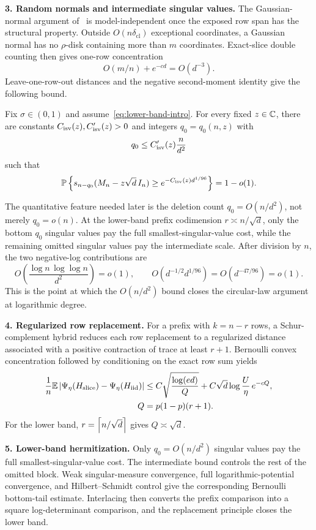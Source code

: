 \smallskip
\noindent\textbf{3. Random normals and intermediate singular values.}
The Gaussian-normal argument of~\cite[Section~4]{LLTTY21} is model-independent once the exposed row span has the structural property. Outside $O(n\delta_{\mathrm{cl}})$ exceptional coordinates, a Gaussian normal has no $\rho$-disk containing more than $m$ coordinates. Exact-slice double counting then gives one-row concentration
\[
  O(m/n)+e^{-cd}=O(d^{-3}).
\]
Leave-one-row-out distances and the negative second-moment identity give the following bound.

\begin{theorem}\label{thm:intro-intermediate}
Fix $\sigma\in(0,1)$ and assume~\eqref{eq:lower-band-intro}. For every fixed $z\in\mathbb C$, there are constants $C_{\mathrm{isv}}(z),C'_{\mathrm{isv}}(z)>0$ and integers $q_0=q_0(n,z)$ with
\[
  q_0\le C'_{\mathrm{isv}}(z)\frac{n}{d^2}
\]
such that
\[
  \mathbb P\left\{
    s_{n-q_0}(M_n-z\sqrt d\,I_n)
    \ge e^{-C_{\mathrm{isv}}(z)d^{1/96}}
  \right\}=1-o(1).
\]
\end{theorem}

The quantitative feature needed later is the deletion count $q_0=O(n/d^2)$, not merely $q_0=o(n)$. At the lower-band prefix codimension $r\asymp n/\sqrt d$, only the bottom $q_0$ singular values pay the full smallest-singular-value cost, while the remaining omitted singular values pay the intermediate scale. After division by $n$, the two negative-log contributions are
\[
  O\!\left(\frac{\log n\,\log\log n}{d^2}\right)=o(1),
  \qquad
  O\!\left(d^{-1/2}d^{1/96}\right)=O(d^{-47/96})=o(1).
\]
This is the point at which the $O(n/d^2)$ bound closes the circular-law argument at logarithmic degree.

\smallskip
\noindent\textbf{4. Regularized row replacement.}
For a prefix with $k=n-r$ rows, a Schur-complement hybrid reduces each row replacement to a regularized distance associated with a positive contraction of trace at least $r+1$. Bernoulli convex concentration followed by conditioning on the exact row sum yields
\begin{align*}
  \frac1n\mathbb E\left|\Psi_\eta(H_{\mathrm{slice}})-\Psi_\eta(H_{\mathrm{iid}})\right|
  &\le C\sqrt{\frac{\log(ed)}{Q}}
  +C\sqrt d\log\frac U\eta\,e^{-cQ},\\
  Q&=p(1-p)(r+1).
\end{align*}
For the lower band, $r=\left\lceil n/\sqrt d\right\rceil$ gives $Q\asymp\sqrt d$.

\smallskip
\noindent\textbf{5. Lower-band hermitization.}
Only $q_0=O(n/d^2)$ singular values pay the full smallest-singular-value cost. The intermediate bound controls the rest of the omitted block. Weak singular-measure convergence, full logarithmic-potential convergence, and Hilbert--Schmidt control give the corresponding Bernoulli bottom-tail estimate. Interlacing then converts the prefix comparison into a square log-determinant comparison, and the replacement principle closes the lower band.


